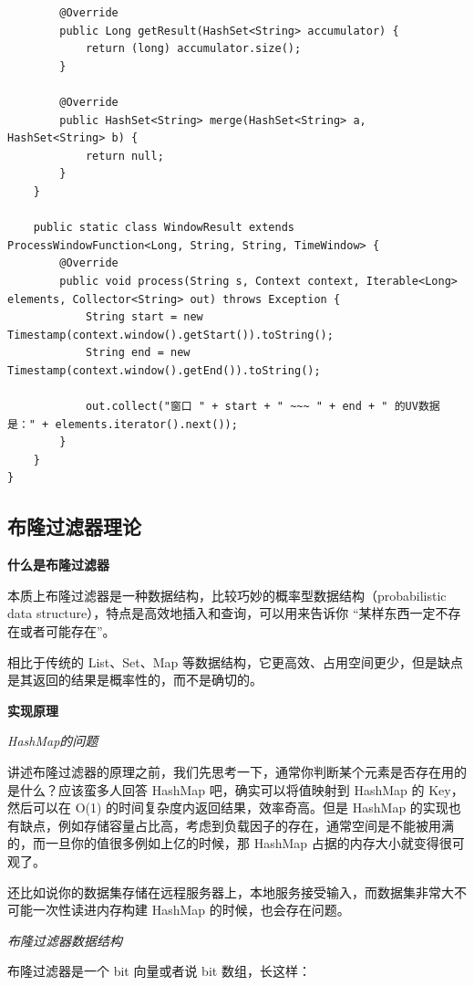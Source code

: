 \documentclass[cn,11pt,chinese]{elegantbook}
\begin{document}
\begin{verbatim}
        @Override
        public Long getResult(HashSet<String> accumulator) {
            return (long) accumulator.size();
        }

        @Override
        public HashSet<String> merge(HashSet<String> a, HashSet<String> b) {
            return null;
        }
    }

    public static class WindowResult extends ProcessWindowFunction<Long, String, String, TimeWindow> {
        @Override
        public void process(String s, Context context, Iterable<Long> elements, Collector<String> out) throws Exception {
            String start = new Timestamp(context.window().getStart()).toString();
            String end = new Timestamp(context.window().getEnd()).toString();

            out.collect("窗口 " + start + " ~~~ " + end + " 的UV数据是：" + elements.iterator().next());
        }
    }
}
\end{verbatim}

\subsection{布隆过滤器理论}

\textbf{什么是布隆过滤器}

本质上布隆过滤器是一种数据结构，比较巧妙的概率型数据结构（probabilistic data structure），特点是高效地插入和查询，可以用来告诉你 “某样东西一定不存在或者可能存在”。

相比于传统的 List、Set、Map 等数据结构，它更高效、占用空间更少，但是缺点是其返回的结果是概率性的，而不是确切的。

\textbf{实现原理}

\textit{HashMap的问题}

讲述布隆过滤器的原理之前，我们先思考一下，通常你判断某个元素是否存在用的是什么？应该蛮多人回答 HashMap 吧，确实可以将值映射到 HashMap 的 Key，然后可以在 O(1) 的时间复杂度内返回结果，效率奇高。但是 HashMap 的实现也有缺点，例如存储容量占比高，考虑到负载因子的存在，通常空间是不能被用满的，而一旦你的值很多例如上亿的时候，那 HashMap 占据的内存大小就变得很可观了。

还比如说你的数据集存储在远程服务器上，本地服务接受输入，而数据集非常大不可能一次性读进内存构建 HashMap 的时候，也会存在问题。

\textit{布隆过滤器数据结构}

布隆过滤器是一个 bit 向量或者说 bit 数组，长这样：
\end{document}
